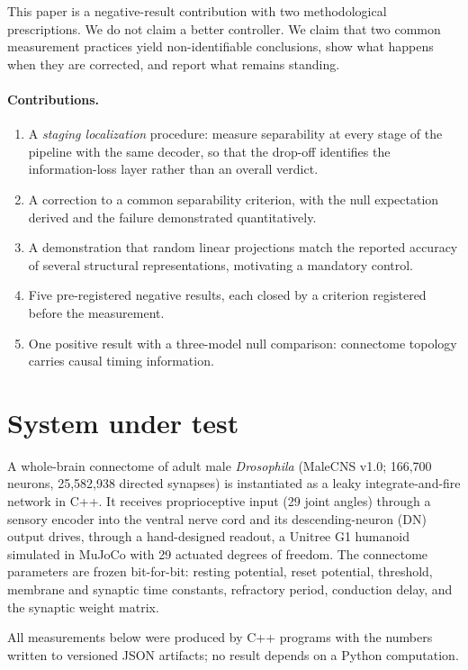 \documentclass[11pt]{article}
\begin{document}
This paper is a negative-result contribution with two methodological
prescriptions. We do not claim a better controller. We claim that two common
measurement practices yield non-identifiable conclusions, show what happens when
they are corrected, and report what remains standing.

\paragraph{Contributions.}
\begin{enumerate}
  \item A \emph{staging localization} procedure: measure separability at every
        stage of the pipeline with the same decoder, so that the drop-off
        identifies the information-loss layer rather than an overall verdict.
  \item A correction to a common separability criterion, with the null
        expectation derived and the failure demonstrated quantitatively.
  \item A demonstration that random linear projections match the reported
        accuracy of several structural representations, motivating a mandatory
        control.
  \item Five pre-registered negative results, each closed by a criterion
        registered before the measurement.
  \item One positive result with a three-model null comparison: connectome
        topology carries causal timing information.
\end{enumerate}

\section{System under test}

A whole-brain connectome of adult male \emph{Drosophila} (MaleCNS v1.0;
166{,}700 neurons, 25{,}582{,}938 directed synapses) is instantiated as a
leaky integrate-and-fire network in C++. It receives proprioceptive input
(29 joint angles) through a sensory encoder into the ventral nerve cord and its
descending-neuron (DN) output drives, through a hand-designed readout, a
Unitree G1 humanoid simulated in MuJoCo with 29 actuated degrees of freedom.
The connectome parameters are frozen bit-for-bit: resting potential, reset
potential, threshold, membrane and synaptic time constants, refractory period,
conduction delay, and the synaptic weight matrix.

All measurements below were produced by C++ programs with the numbers written to
versioned JSON artifacts; no result depends on a Python computation.
\end{document}
